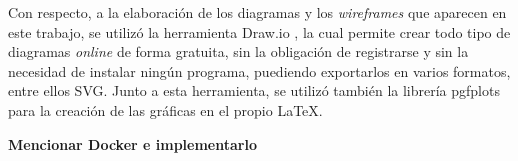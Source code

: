 \bigskip
Con respecto, a la elaboración de los diagramas y los \textit{wireframes} que aparecen en este trabajo, se utilizó la herramienta Draw.io \cite{drawio}, la cual permite crear todo tipo de diagramas
\textit{online} de forma gratuita, sin la obligación de registrarse y sin la necesidad de instalar ningún programa, puediendo exportarlos en varios formatos, entre ellos SVG.
Junto a esta herramienta, se utilizó también la librería pgfplots \cite{pgfplots} para la creación de las gráficas en el propio \LaTeX.

\bigskip
\textbf{Mencionar Docker e implementarlo}
